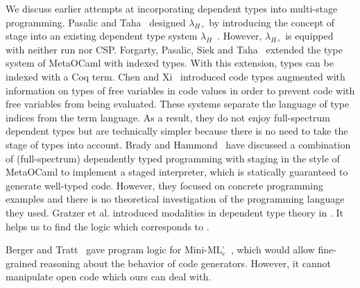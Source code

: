 We discuss earlier attempts at incorporating dependent types into multi-stage
programming.  Pasalic and Taha~\cite{PasalicTahaSheard2002Tagless} designed
\(\lambda_{H\circ}\) by introducing the concept of stage into an existing
dependent type system \(\lambda_H\)~\cite{ShaoSahaTrifonovPapaspyrou2002Certified}.  However,
\(\lambda_{H\circ}\) is equipped with neither run nor CSP.  Forgarty, Pasalic,
Siek and Taha~\cite{FogartyPasalicSiekTaha2007Concoqtion} extended the type system of
MetaOCaml with indexed types.  With this extension, types can be indexed with a
Coq term.  Chen and Xi~\cite{ChenXi2003Meta} introduced code types augmented with
information on types of free variables in code values in order to prevent code
with free variables from being evaluated.  These systems separate the language
of type indices from the term language.  As a result, they do not enjoy
full-spectrum dependent types but are technically simpler because there is no
need to take the stage of types into account.  Brady and
Hammond~\cite{BradyHammond2006Dependently} have discussed a combination of
(full-spectrum) dependently typed programming with staging in the style of
MetaOCaml to implement a staged interpreter, which is statically guaranteed to
generate well-typed code.  However, they focused on concrete programming
examples and there is no theoretical investigation of the programming language
they used. Gratzer et al. introduced modalities in dependent type theory in
\cite{GratzerSterlingBirkedal2019ModalDependent}. It helps us to find the logic which
corresponds to \LMD.

Berger and Tratt~\cite{BergerTratt2015HGRTMP} gave program logic for
\(\text{Mini-ML}^\square_e\)~\cite{DaviesPfenning01JACM}, which would
allow fine-grained reasoning about the behavior of code generators.
However, it cannot manipulate open code which ours can deal with.


